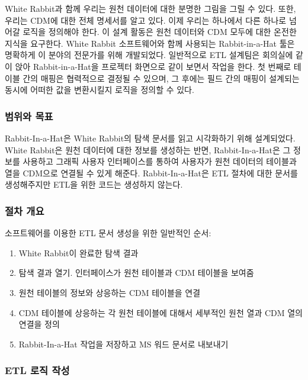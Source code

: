 \documentclass[10.5pt]{book}
\providecommand{\tightlist}{%
  \setlength{\itemsep}{0pt}\setlength{\parskip}{0pt}}
\theoremstyle{definition}
\theoremstyle{definition}
\theoremstyle{definition}
\theoremstyle{remark}
\begin{document}
White Rabbit과 함께 우리는 원천 데이터에 대한 분명한 그림을 그릴 수
있다. 또한, 우리는 CDM에 대한 전체 명세서를 알고 있다. 이제 우리는
하나에서 다른 하나로 넘어갈 로직을 정의해야 한다. 이 설계 활동은 원천
데이터와 CDM 모두에 대한 온전한 지식을 요구한다. White Rabbit
소프트웨어와 함께 사용되는 Rabbit-in-a-Hat 툴은 명확하게 이 분야의
전문가를 위해 개발되었다. 일반적으로 ETL 설계팀은 회의실에 같이 앉아
Rabbit-in-a-Hat을 프로젝터 화면으로 같이 보면서 작업을 한다. 첫 번째로
테이블 간의 매핑은 협력적으로 결정될 수 있으며, 그 후에는 필드 간의
매핑이 설계되는 동시에 어떠한 값을 변환시킬지 로직을 정의할 수 있다.
 

\subsubsection*{범위와 목표}\label{--1}

Rabbit-In-a-Hat은 White Rabbit의 탐색 문서를 읽고 시각화하기 위해
설계되었다. White Rabbit은 원천 데이터에 대한 정보를 생성하는 반면,
Rabbit-In-a-Hat은 그 정보를 사용하고 그래픽 사용자 인터페이스를 통하여
사용자가 원천 데이터의 테이블과 열을 CDM으로 연결될 수 있게 해준다.
Rabbit-In-a-Hat은 ETL 절차에 대한 문서를 생성해주지만 ETL을 위한 코드는
생성하지 않는다.

\subsubsection*{절차 개요}\label{--1}

소프트웨어를 이용한 ETL 문서 생성을 위한 일반적인 순서:

\begin{enumerate}
\def\labelenumi{\arabic{enumi}.}
\tightlist
\item
  White Rabbit이 완료한 탐색 결과
\item
  탐색 결과 열기. 인터페이스가 원천 테이블과 CDM 테이블을 보여줌
\item
  원천 테이블의 정보와 상응하는 CDM 테이블을 연결
\item
  CDM 테이블에 상응하는 각 원천 테이블에 대해서 세부적인 원천 열과 CDM
  열의 연결을 정의
\item
  Rabbit-In-a-Hat 작업을 저장하고 MS 워드 문서로 내보내기
\end{enumerate}

\subsubsection*{ETL 로직 작성}\label{etl--}
\end{document}
